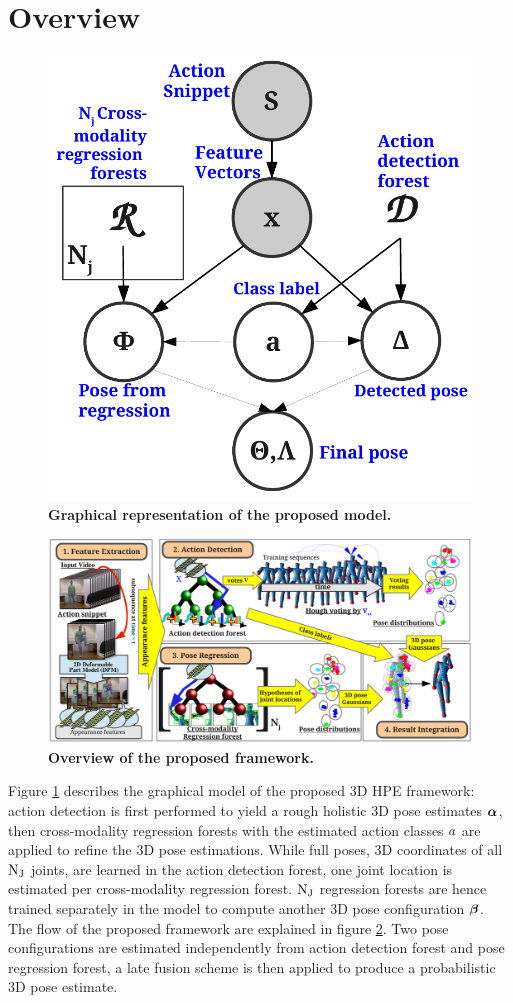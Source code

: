 \section{Overview}
\label{sec/body/method}

\begin{figure}[t]
	\centering
	\includegraphics[width=0.35\linewidth]{fig/body/figure4.pdf}
	\caption{\textbf{Graphical representation of the proposed model.}}
	\label{fig/body/figure4gm}
\end{figure}

\begin{figure}[ht]
	\centering
	\includegraphics[width=1\linewidth]{fig/body/figure3_overview.pdf}
	\caption{\textbf{Overview of the proposed framework.}}
	\label{fig/body/overview}
\end{figure} 


Figure \ref{fig/body/figure4gm} describes the graphical model of the proposed 3D HPE framework: action detection is first performed to yield a rough holistic 3D pose estimates $\boldsymbol{\alpha}$, then cross-modality regression forests with the estimated action classes $a$ are applied to refine the 3D pose estimations. 
While full poses, \ie 3D coordinates of all $\mathrm{N_{J}}$ joints, are learned in the action detection forest, one joint location is estimated per cross-modality regression forest. 
$\mathrm{N_{J}}$ regression forests are hence trained separately in the model to compute another 3D pose configuration $\boldsymbol{\beta}$. 
The flow of the proposed framework are explained in figure \ref{fig/body/overview}. Two pose configurations are estimated independently from action detection forest and pose regression forest, a late fusion scheme is then applied to produce a probabilistic 3D pose estimate.  

